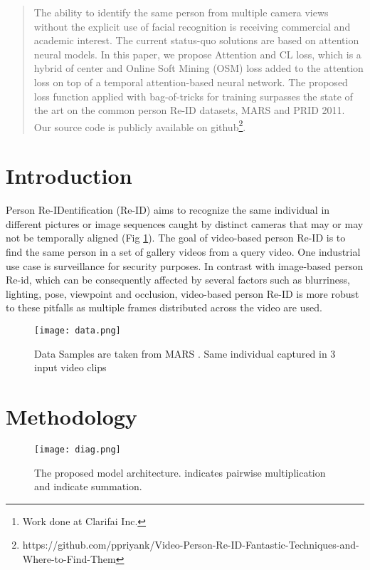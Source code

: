 \documentclass[letterpaper]{article} \usepackage{aaai20}  \usepackage{times}  \usepackage{helvet} \usepackage{courier}  \usepackage[hyphens]{url}  \usepackage{graphicx} \urlstyle{rm} \def\UrlFont{\rm}  \usepackage{graphicx}  \frenchspacing  \setlength{\pdfpagewidth}{8.5in}  \setlength{\pdfpageheight}{11in}
\author{\\  \Large \textbf{ Priyank Pathak,\textsuperscript{\rm 1}\thanks{Work done at Clarifai Inc.} Amir Erfan Eshratifar,\textsuperscript{\rm 2}\footnotemark[1]  Michael Gormish\textsuperscript{\rm 3}\footnotemark[1]} \\ 
\textsuperscript{\rm 1} Department of Computer Science, New York University,
New York, NY 10012, USA \\ 
\textsuperscript{\rm 2}University of Southern California, Los Angeles, CA 90089, USA\\
\textsuperscript{\rm 3}Clarifai, San Francisco, CA 94105, USA\\
ppriyank@nyu.edu, eshratif@usc.edu, michael.gormish@clarifai.com
}
\begin{document}
\maketitle

\begin{abstract}
The ability to identify the same person from multiple camera views without the explicit use of facial recognition is receiving commercial and academic interest. The current status-quo solutions are based on attention neural models. In this paper, we propose Attention and CL loss, which is a hybrid of center and Online Soft Mining (OSM) loss added to the attention loss on top of a temporal attention-based neural network. The proposed loss function applied with bag-of-tricks for training surpasses the state of the art on the common person Re-ID datasets, MARS and PRID 2011. Our source code is publicly available on github\footnote{https://github.com/ppriyank/Video-Person-Re-ID-Fantastic-Techniques-and-Where-to-Find-Them}. 
\end{abstract}


\section{Introduction}
\noindent  Person Re-IDentification (Re-ID) aims to recognize the same individual in different pictures or image sequences caught by distinct cameras that may or may not be temporally aligned (Fig \ref{fig:data}). The goal of video-based person Re-ID is to find the same person in a set of gallery videos from a query video. One industrial use case is surveillance for security purposes. In contrast with image-based person Re-id, which can be consequently affected by several factors such as blurriness, lighting, pose, viewpoint and occlusion, video-based person Re-ID is more robust to these pitfalls as multiple frames distributed across the video are used.

\begin{figure}[!t]
 \centering
 \texttt{[image: data.png]}
 \caption{Data Samples are taken from  MARS \cite{MARS}. 
Same individual captured in 3 input video clips
}
 \label{fig:data}
 \end{figure}

\section{Methodology}

\begin{figure*}[!ht]
 \centering
 \texttt{[image: diag.png]}
 \caption{The proposed model architecture.  indicates pairwise multiplication and  indicate summation. 
}
 \label{fig:architecture}
 \end{figure*}
 
\end{document}

